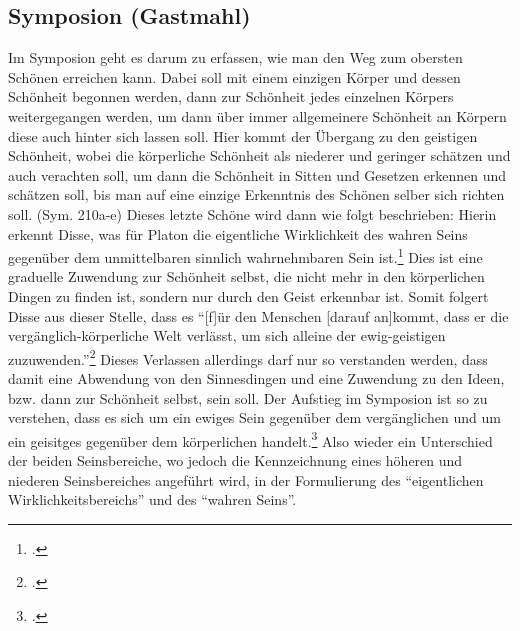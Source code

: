 \subsection{Symposion (Gastmahl)}
Im Symposion geht es darum zu erfassen, wie man den Weg zum obersten Schönen erreichen kann. Dabei soll mit einem einzigen Körper und dessen Schönheit begonnen werden, dann zur Schönheit jedes einzelnen Körpers weitergegangen werden, um dann über immer allgemeinere Schönheit an Körpern diese auch hinter sich lassen soll. Hier kommt der Übergang zu den geistigen Schönheit, wobei die körperliche Schönheit als niederer und geringer schätzen und auch verachten soll, um dann die Schönheit in Sitten und Gesetzen erkennen und schätzen soll, bis man auf eine einzige Erkenntnis des Schönen selber sich richten soll. (Sym. 210a-e)  
Dieses letzte Schöne wird dann wie folgt beschrieben: 
Hierin erkennt Disse, was für Platon die eigentliche Wirklichkeit des wahren Seins gegenüber dem unmittelbaren sinnlich wahrnehmbaren Sein ist.\footcite[vgl.][S. 27]{DisseMetaphysik} Dies ist eine graduelle Zuwendung zur Schönheit selbst, die nicht mehr in den körperlichen Dingen zu finden ist, sondern nur durch den Geist erkennbar ist. Somit folgert Disse aus dieser Stelle, dass es \enquote{[f]ür den Menschen [darauf an]kommt, dass er die vergänglich-körperliche Welt verlässt, um sich alleine der ewig-geistigen zuzuwenden.}\footcite[vgl.][S. 28]{DisseMetaphysik} Dieses Verlassen allerdings darf nur so verstanden werden, dass damit eine Abwendung von den Sinnesdingen und eine Zuwendung zu den Ideen, bzw. dann zur Schönheit selbst, sein soll. 
Der Aufstieg im Symposion ist so zu verstehen, dass es sich um ein ewiges Sein gegenüber dem vergänglichen und um ein geisitges gegenüber dem körperlichen handelt.\footcite[vgl.][S. 27f.]{DisseMetaphysik}
Also wieder ein Unterschied der beiden Seinsbereiche, wo jedoch die Kennzeichnung eines höheren und niederen Seinsbereiches angeführt wird, in der Formulierung des \enquote{eigentlichen Wirklichkeitsbereichs} und des \enquote{wahren Seins}.
